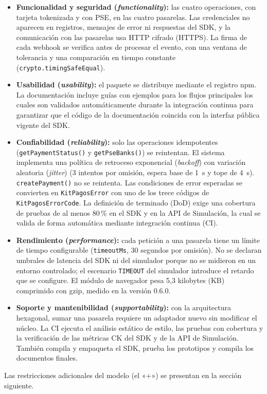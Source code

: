 \begin{itemize}
    \item \textbf{Funcionalidad y seguridad (\textit{functionality}):} las cuatro operaciones, con tarjeta tokenizada y con PSE, en las cuatro pasarelas. Las credenciales no aparecen en registros, mensajes de error ni respuestas del SDK, y la comunicación con las pasarelas usa HTTP cifrado (HTTPS). La firma de cada webhook se verifica antes de procesar el evento, con una ventana de tolerancia y una comparación en tiempo constante (\texttt{crypto.timingSafeEqual}).
    \item \textbf{Usabilidad (\textit{usability}):} el paquete se distribuye mediante el registro npm. La documentación incluye guías con ejemplos para los flujos principales los cuales son validados automáticamente durante la integración continua para garantizar que el código de la documentación coincida con la interfaz pública vigente del SDK.
    \item \textbf{Confiabilidad (\textit{reliability}):} solo las operaciones idempotentes (\texttt{getPaymentStatus()} y \texttt{getPseBanks()}) se reintentan. El sistema implementa una política de retroceso exponencial (\textit{backoff}) con variación aleatoria (\textit{jitter}) (3 intentos por omisión, espera base de 1~s y tope de 4~s). \texttt{createPayment()} no se reintenta. Las condiciones de error esperadas se convierten en \texttt{KitPagosError} con uno de los trece códigos de \texttt{KitPagosErrorCode}. La definición de terminado (DoD) exige una cobertura de pruebas de al menos 80\,\% en el SDK y en la API de Simulación, la cual se valida de forma automática mediante integración continua (CI).
    \item \textbf{Rendimiento (\textit{performance}):} cada petición a una pasarela tiene un límite de tiempo configurable (\texttt{timeoutMs}, 30 segundos por omisión). No se declaran umbrales de latencia del SDK ni del simulador porque no se midieron en un entorno controlado; el escenario \texttt{TIMEOUT} del simulador introduce el retardo que se configure. El módulo de navegador pesa 5,3 kilobytes (KB) comprimido con gzip, medido en la versión 0.6.0.
    \item \textbf{Soporte y mantenibilidad (\textit{supportability}):} con la arquitectura hexagonal, sumar una pasarela requiere un adaptador nuevo sin modificar el núcleo. La CI ejecuta el análisis estático de estilo, las pruebas con cobertura y la verificación de las métricas CK del SDK y de la API de Simulación. También compila y empaqueta el SDK, prueba los prototipos y compila los documentos finales.
\end{itemize}
Las restricciones adicionales del modelo (el «+») se presentan en la sección siguiente.

